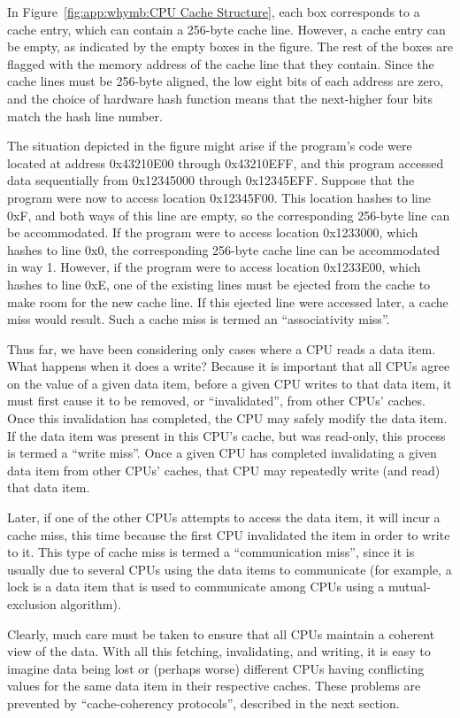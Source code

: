 In Figure~\ref{fig:app:whymb:CPU Cache Structure},
each box corresponds to a cache entry, which
can contain a 256-byte cache line.
However, a cache entry can be empty, as indicated by the empty boxes
in the figure.
The rest of the boxes are flagged with the memory address of the cache line
that they contain.
Since the cache lines must be 256-byte aligned, the low eight bits of
each address are
zero, and the choice of hardware hash function means that the next-higher
four bits match the hash line number.

The situation depicted in the figure might arise if the program's code
were located at address 0x43210E00 through 0x43210EFF, and this program
accessed data sequentially from 0x12345000 through 0x12345EFF.
Suppose that the program were now to access location 0x12345F00.
This location hashes to line 0xF, and both ways of this line are
empty, so the corresponding 256-byte line can be accommodated.
If the program were to access location 0x1233000, which hashes to line
0x0, the corresponding 256-byte cache line can be accommodated in
way 1.
However, if the program were to access location 0x1233E00, which hashes
to line 0xE, one of the existing lines must be ejected from the cache
to make room for the new cache line.
If this ejected line were accessed later, a cache miss would result.
Such a cache miss is termed an ``associativity miss''.

Thus far, we have been considering only cases where a CPU reads
a data item.
What happens when it does a write?
Because it is important that all CPUs agree on the value of a given
data item, before a given CPU writes to that data item, it must first
cause it to be removed, or ``invalidated'', from other CPUs' caches.
Once this invalidation has completed, the CPU may safely modify the
data item.
If the data item was present in this CPU's cache, but was read-only,
this process is termed a ``write miss''.
Once a given CPU has completed invalidating a given data item from other
CPUs' caches, that CPU may repeatedly write (and read) that data item.

Later, if one of the other CPUs attempts to access the data item, it
will incur a cache miss, this time because the first CPU invalidated
the item in order to write to it.
This type of cache miss is termed a ``communication miss'', since it
is usually due to several CPUs using the data items to communicate
(for example, a lock is a data item that is used to communicate among
CPUs using a mutual-exclusion algorithm).

Clearly, much care must be taken to ensure that all CPUs maintain
a coherent view of the data.
With all this fetching, invalidating, and writing, it is easy to
imagine data being lost or (perhaps worse) different CPUs having
conflicting values for the same data item in their respective
caches.
These problems are prevented by ``cache-coherency protocols'',
described in the next section.


